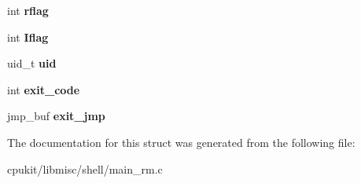 \begin{DoxyCompactItemize}
int {\bfseries rflag}
\item 
\mbox{\label{structrtems__shell__rm__globals_a6e1a9c6860c8951db48b77a6acd8131c}} 
int {\bfseries Iflag}
\item 
\mbox{\label{structrtems__shell__rm__globals_afcb807f1d44c5ae53674882be8d9e89f}} 
uid\+\_\+t {\bfseries uid}
\item 
\mbox{\label{structrtems__shell__rm__globals_a969a4c694715aae092397d997790d875}} 
int {\bfseries exit\+\_\+code}
\item 
\mbox{\label{structrtems__shell__rm__globals_afd5ae5b0000446ea953cde2acebaa72f}} 
jmp\+\_\+buf {\bfseries exit\+\_\+jmp}
\end{DoxyCompactItemize}


The documentation for this struct was generated from the following file\+:\begin{DoxyCompactItemize}
\item 
cpukit/libmisc/shell/main\+\_\+rm.\+c\end{DoxyCompactItemize}
